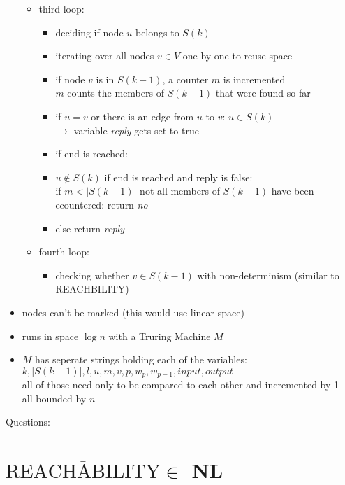 \documentclass[a4]{scrartcl}
\begin{document}
\begin{itemize}
\begin{itemize}
\item third loop:
\begin{itemize}
\item deciding if node $u$ belongs to $S(k)$
\item iterating over all nodes $v \in V$ one by one to reuse space
\item if node $v$ is in $S(k-1)$, a counter $m$ is incremented \\
$m$ counts the members of $S(k-1)$ that were found so far
\item if $u = v$ or there is an edge from $u$ to $v$: $u \in S(k)$ \\
$\rightarrow$ variable \textit{reply} gets set to true \\
\item if end is reached:
\item $u \notin S(k)$ if end is reached and reply is false: \\
if $m  < |S(k-1)|$ not all members of $S(k-1)$ have been ecountered: return \textit{no}
\item else return \textit{reply} \\
\end{itemize}

\item fourth loop:
\begin{itemize}
\item checking whether $v \in S(k-1)$ with non-determinism (similar to REACHBILITY)
\end{itemize}



\end{itemize}

\item nodes can't be marked (this would use linear space) 
\item runs in space $\log n$ with a Truring Machine $M$
\item $M$ has seperate strings holding each of the variables: $k, |S(k-1)|, l, u, m, v, p, w_p, w_{p-1}, input, output$ \\
all of those need only to be compared to each other and incremented by 1 \\
all bounded by $n$ 


\end{itemize}


\color{violet} Questions:
\color{black}




\section*{$\overline{\text{REACHABILITY}} \in$ NL}
\end{document}
